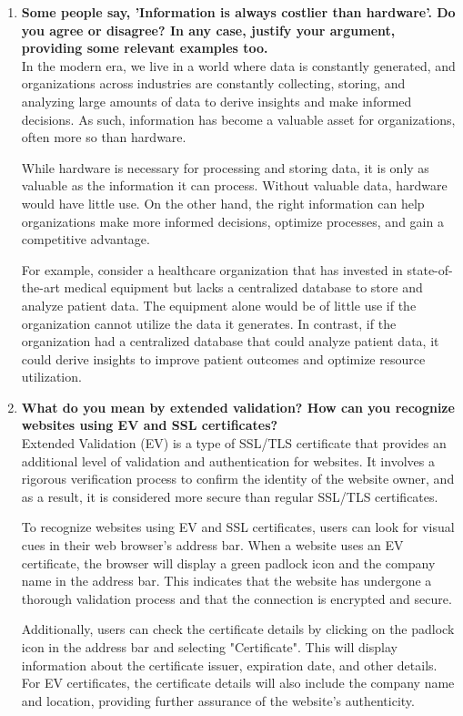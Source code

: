 \documentclass[12pt]{article}
\begin{document}
\begin{enumerate}
    \item {\bfseries Some people say, 'Information is always costlier than hardware'. Do you agree or disagree? In any case, justify your argument, providing some relevant examples too.\\}
    In the modern era, we live in a world where data is constantly generated, and organizations across industries are constantly collecting, storing, and analyzing large amounts of data to derive insights and make informed decisions. As such, information has become a valuable asset for organizations, often more so than hardware.

While hardware is necessary for processing and storing data, it is only as valuable as the information it can process. Without valuable data, hardware would have little use. On the other hand, the right information can help organizations make more informed decisions, optimize processes, and gain a competitive advantage.

For example, consider a healthcare organization that has invested in state-of-the-art medical equipment but lacks a centralized database to store and analyze patient data. The equipment alone would be of little use if the organization cannot utilize the data it generates. In contrast, if the organization had a centralized database that could analyze patient data, it could derive insights to improve patient outcomes and optimize resource utilization.
    \item {\bfseries What do you mean by extended validation? How can you recognize websites using EV and SSL certificates?\\}
    Extended Validation (EV) is a type of SSL/TLS certificate that provides an additional level of validation and authentication for websites. It involves a rigorous verification process to confirm the identity of the website owner, and as a result, it is considered more secure than regular SSL/TLS certificates.

To recognize websites using EV and SSL certificates, users can look for visual cues in their web browser's address bar. When a website uses an EV certificate, the browser will display a green padlock icon and the company name in the address bar. This indicates that the website has undergone a thorough validation process and that the connection is encrypted and secure.

Additionally, users can check the certificate details by clicking on the padlock icon in the address bar and selecting "Certificate". This will display information about the certificate issuer, expiration date, and other details. For EV certificates, the certificate details will also include the company name and location, providing further assurance of the website's authenticity.
    

\end{enumerate}
\end{document}

